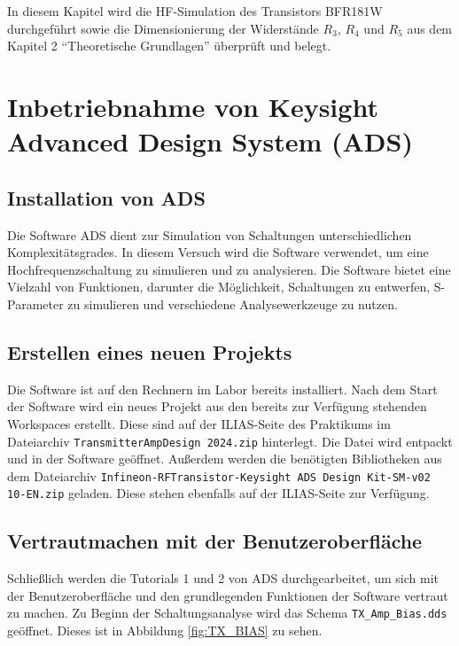 In diesem Kapitel wird die \ac{HF}-Simulation des Transistors BFR181W durchgeführt sowie die Dimensionierung der Widerstände $R_3$, $R_4$ und $R_5$ aus dem Kapitel 2 \enquote{Theoretische Grundlagen} überprüft und belegt.

\section{Inbetriebnahme von Keysight Advanced Design System (ADS)}
\subsection{Installation von ADS}
Die Software \ac{ADS} dient zur Simulation von Schaltungen unterschiedlichen Komplexitätsgrades. 
In diesem Versuch wird die Software verwendet, um eine Hochfrequenzschaltung zu simulieren und zu analysieren. 
Die Software bietet eine Vielzahl von Funktionen, darunter die Möglichkeit, Schaltungen zu entwerfen, S-Parameter zu simulieren und verschiedene Analysewerkzeuge zu nutzen.

\subsection{Erstellen eines neuen Projekts}
Die Software ist auf den Rechnern im Labor bereits installiert. 
Nach dem Start der Software wird ein neues Projekt aus den bereits zur Verfügung stehenden Workspaces erstellt. 
Diese sind auf der ILIAS-Seite des Praktikums im Dateiarchiv \texttt{TransmitterAmpDesign 2024.zip} hinterlegt. 
Die Datei wird entpackt und in der Software geöffnet. Außerdem werden die benötigten Bibliotheken aus dem Dateiarchiv \texttt{Infineon-RFTransistor-Keysight ADS Design Kit-SM-v02 10-EN.zip} geladen. Diese stehen ebenfalls auf der ILIAS-Seite zur Verfügung.

\subsection{Vertrautmachen mit der Benutzeroberfläche}
Schließlich werden die Tutorials 1 und 2 von \ac{ADS} durchgearbeitet, um sich mit der Benutzeroberfläche und den grundlegenden Funktionen der Software vertraut zu machen.
Zu Beginn der Schaltungsanalyse wird das Schema \texttt{TX\_Amp\_Bias.dds} geöffnet. Dieses ist in Abbildung \ref{fig:TX_BIAS} zu sehen.

